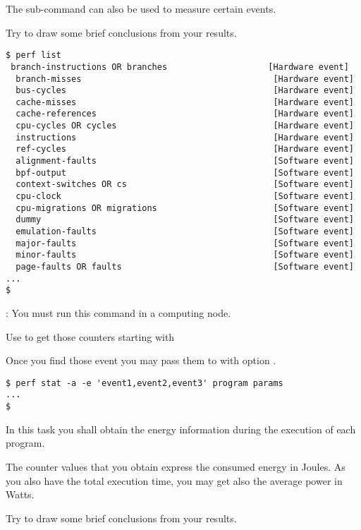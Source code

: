 The  sub-command can also be used to measure certain events.

Try to draw some brief conclusions from your results.

\begin{lstlisting}[style=terminal]
$ perf list
 branch-instructions OR branches                    [Hardware event]
  branch-misses                                      [Hardware event]
  bus-cycles                                         [Hardware event]
  cache-misses                                       [Hardware event]
  cache-references                                   [Hardware event]
  cpu-cycles OR cycles                               [Hardware event]
  instructions                                       [Hardware event]
  ref-cycles                                         [Hardware event]
  alignment-faults                                   [Software event]
  bpf-output                                         [Software event]
  context-switches OR cs                             [Software event]
  cpu-clock                                          [Software event]
  cpu-migrations OR migrations                       [Software event]
  dummy                                              [Software event]
  emulation-faults                                   [Software event]
  major-faults                                       [Software event]
  minor-faults                                       [Software event]
  page-faults OR faults                              [Software event]
...
$
\end{lstlisting}

:
You must run this command in a computing node.

Use  to get those counters starting with 

Once you find those event you may pass them to  with
option .

\begin{lstlisting}[style=terminal]
$ perf stat -a -e 'event1,event2,event3' program params
...
$
\end{lstlisting}

In this task you shall obtain the energy information during the execution of each program.

The counter values that you obtain express the consumed energy in Joules.
As you also have the total execution time, you may get also the average power in Watts.

Try to draw some brief conclusions from your results.
